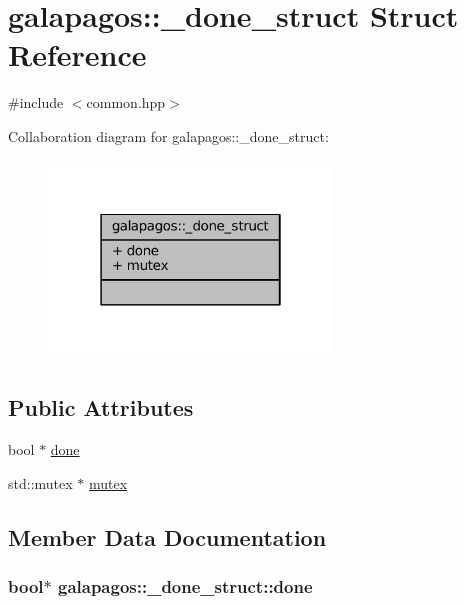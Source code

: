 \hypertarget{structgalapagos_1_1__done__struct}{}\section{galapagos\+:\+:\+\_\+done\+\_\+struct Struct Reference}
\label{structgalapagos_1_1__done__struct}


{\ttfamily \#include $<$common.\+hpp$>$}



Collaboration diagram for galapagos\+:\+:\+\_\+done\+\_\+struct\+:
\nopagebreak
\begin{figure}[H]
\begin{center}
\leavevmode
\includegraphics[width=214pt]{structgalapagos_1_1__done__struct__coll__graph}
\end{center}
\end{figure}
\subsection*{Public Attributes}
\begin{DoxyCompactItemize}
\item 
bool $\ast$ \hyperlink{structgalapagos_1_1__done__struct_a5fa9195fd41e90b6525b2beaced4de0e}{done}
\item 
std\+::mutex $\ast$ \hyperlink{structgalapagos_1_1__done__struct_ac4bd65b6a9581344f8943a499dbd5456}{mutex}
\end{DoxyCompactItemize}


\subsection{Member Data Documentation}
\subsubsection[{\texorpdfstring{done}{done}}]{\setlength{\rightskip}{0pt plus 5cm}bool$\ast$ galapagos\+::\+\_\+done\+\_\+struct\+::done}\hypertarget{structgalapagos_1_1__done__struct_a5fa9195fd41e90b6525b2beaced4de0e}{}\label{structgalapagos_1_1__done__struct_a5fa9195fd41e90b6525b2beaced4de0e}
